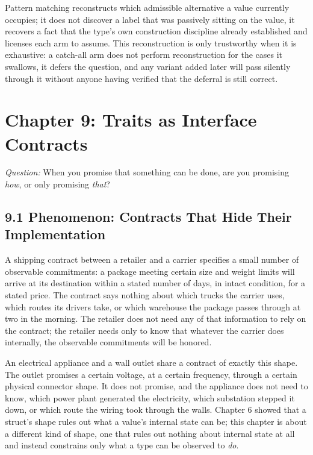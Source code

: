 \documentclass[11pt]{book}
\begin{document}
\begin{invariantbox}
Pattern matching reconstructs which admissible alternative a value currently occupies; it does not discover a label that was passively sitting on the value, it recovers a fact that the type's own construction discipline already established and licenses each arm to assume. This reconstruction is only trustworthy when it is exhaustive: a catch-all arm does not perform reconstruction for the cases it swallows, it defers the question, and any variant added later will pass silently through it without anyone having verified that the deferral is still correct.
\end{invariantbox}

\clearpage

\chapter*{Chapter 9: Traits as Interface Contracts}

\begin{firstprinciples}
\textit{Question:} When you promise that something can be done, are you promising \emph{how}, or only promising \emph{that}?
\end{firstprinciples}

\section*{9.1 Phenomenon: Contracts That Hide Their Implementation}

A shipping contract between a retailer and a carrier specifies a small number of observable commitments: a package meeting certain size and weight limits will arrive at its destination within a stated number of days, in intact condition, for a stated price. The contract says nothing about which trucks the carrier uses, which routes its drivers take, or which warehouse the package passes through at two in the morning. The retailer does not need any of that information to rely on the contract; the retailer needs only to know that whatever the carrier does internally, the observable commitments will be honored.

An electrical appliance and a wall outlet share a contract of exactly this shape. The outlet promises a certain voltage, at a certain frequency, through a certain physical connector shape. It does not promise, and the appliance does not need to know, which power plant generated the electricity, which substation stepped it down, or which route the wiring took through the walls. Chapter 6 showed that a struct's shape rules out what a value's internal state can be; this chapter is about a different kind of shape, one that rules out nothing about internal state at all and instead constrains only what a type can be observed to \emph{do}.
\end{document}

